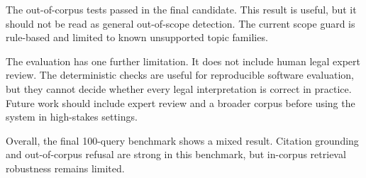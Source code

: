 The out-of-corpus tests passed in the final candidate. This result is useful, but it should not be read as general out-of-scope detection. The current scope guard is rule-based and limited to known unsupported topic families.

The evaluation has one further limitation. It does not include human legal expert review. The deterministic checks are useful for reproducible software evaluation, but they cannot decide whether every legal interpretation is correct in practice. Future work should include expert review and a broader corpus before using the system in high-stakes settings.

Overall, the final 100-query benchmark shows a mixed result. Citation grounding and out-of-corpus refusal are strong in this benchmark, but in-corpus retrieval robustness remains limited.
